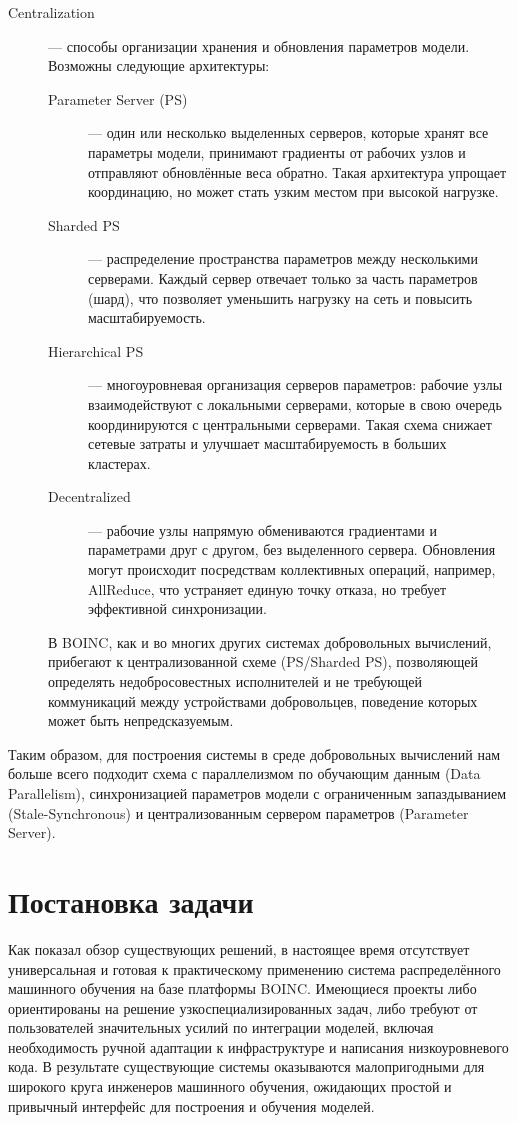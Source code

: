 \documentclass[a4paper,12pt]{extarticle}
\begin{document}
\begin{description}
    \item[Centralization] — способы организации хранения и обновления параметров модели. Возможны следующие архитектуры:
    \begin{description}
        \item[Parameter Server (PS)] — один или несколько выделенных серверов, которые хранят все параметры модели, принимают градиенты от рабочих узлов и отправляют обновлённые веса обратно. Такая архитектура упрощает координацию, но может стать узким местом при высокой нагрузке.
        \item[Sharded PS] — распределение пространства параметров между несколькими серверами. Каждый сервер отвечает только за часть параметров (шард), что позволяет уменьшить нагрузку на сеть и повысить масштабируемость.
        \item[Hierarchical PS] — многоуровневая организация серверов параметров: рабочие узлы взаимодействуют с локальными серверами, которые в свою очередь координируются с центральными серверами. Такая схема снижает сетевые затраты и улучшает масштабируемость в больших кластерах.
        \item[Decentralized] — рабочие узлы напрямую обмениваются градиентами и параметрами друг с другом, без выделенного сервера. Обновления могут происходит посредствам коллективных операций, например, AllReduce, что устраняет единую точку отказа, но требует эффективной синхронизации.
    \end{description}

    В BOINC, как и во многих других системах добровольных вычислений, прибегают к централизованной схеме (PS/Sharded PS), позволяющей определять недобросовестных исполнителей и не требующей коммуникаций между устройствами добровольцев, поведение которых может быть непредсказуемым.
\end{description}

Таким образом, для построения системы в среде добровольных вычислений нам больше всего подходит схема с параллелизмом по обучающим данным (Data Parallelism), синхронизацией параметров модели с ограниченным запаздыванием (Stale-Synchronous) и централизованным сервером параметров (Parameter Server).

\section{Постановка задачи}

Как показал обзор существующих решений, в настоящее время отсутствует универсальная и готовая к практическому применению система распределённого машинного обучения на базе платформы BOINC. Имеющиеся проекты либо ориентированы на решение узкоспециализированных задач, либо требуют от пользователей значительных усилий по интеграции моделей, включая необходимость ручной адаптации к инфраструктуре и написания низкоуровневого кода. В результате существующие системы оказываются малопригодными для широкого круга инженеров машинного обучения, ожидающих простой и привычный интерфейс для построения и обучения моделей.
\end{document}
